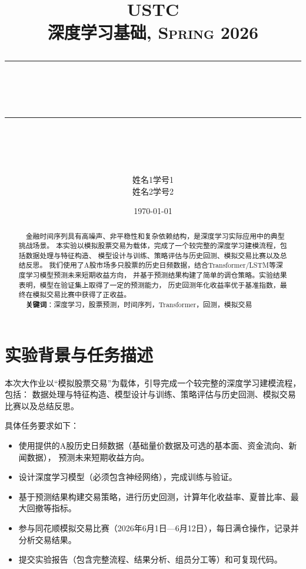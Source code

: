 \documentclass[12pt]{article} %
\newcommand{\horrule}[1]{\rule[0.5ex]{\linewidth}{#1}}
\begin{document}
\title{
    {\normalfont\normalsize\textsc{
                USTC\\
                深度学习基础, Spring 2026 \\[25pt]}}
    \horrule{0.5pt}\\
    \horrule{1.8pt}\\[20pt]}
\author{姓名1\quad 学号1\\姓名2\quad 学号2}
\date{\today}

\begin{titlepage}
    \maketitle
    \newpage
    \vspace{30pt}
    \begin{abstract}
        \normalsize \ \
        金融时间序列具有高噪声、非平稳性和复杂依赖结构，是深度学习实际应用中的典型挑战场景。
        本实验以模拟股票交易为载体，完成了一个较完整的深度学习建模流程，包括数据处理与特征构造、
        模型设计与训练、策略评估与历史回测、模拟交易比赛以及总结反思。
        我们使用了A股市场多只股票的历史日频数据，结合Transformer/LSTM等深度学习模型预测未来短期收益方向，
        并基于预测结果构建了简单的调仓策略。实验结果表明，模型在验证集上取得了一定的预测能力，
        历史回测年化收益率优于基准指数，最终在模拟交易比赛中获得了正收益。
        \\[2pt]
        \indent \ \ \textbf{关键词}：深度学习，股票预测，时间序列，Transformer，回测，模拟交易
    \end{abstract}
    \thispagestyle{empty}
\end{titlepage}

\tableofcontents
\thispagestyle{empty}

\newpage
\setcounter{page}{1}

\section{实验背景与任务描述}

本次大作业以“模拟股票交易”为载体，引导完成一个较完整的深度学习建模流程，包括：
数据处理与特征构造、模型设计与训练、策略评估与历史回测、模拟交易比赛以及总结反思。

具体任务要求如下：
\begin{itemize}
    \item 使用提供的A股历史日频数据（基础量价数据及可选的基本面、资金流向、新闻数据），
        预测未来短期收益方向。
    \item 设计深度学习模型（必须包含神经网络），完成训练与验证。
    \item 基于预测结果构建交易策略，进行历史回测，计算年化收益率、夏普比率、最大回撤等指标。
    \item 参与同花顺模拟交易比赛（2026年6月1日—6月12日），每日满仓操作，记录并分析交易结果。
    \item 提交实验报告（包含完整流程、结果分析、组员分工等）和可复现代码。
\end{itemize}
\end{document}
